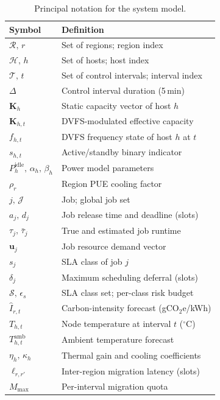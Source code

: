 \documentclass[a4paper,fleqn]{cas-dc}
\begin{document}
\begin{table}[!htb]
\centering
\caption{Principal notation for the system model.}
\label{tab:notation}
\footnotesize
\setlength{\tabcolsep}{6pt}
\renewcommand{\arraystretch}{1.25}
\begin{tabular}{>{\bfseries}p{3.1cm} p{4.8cm}}
\toprule
\normalfont\textbf{Symbol} & \textbf{Definition} \\
\midrule
\rowcolor{black!5}$\mathcal{R},\,r$              & Set of regions; region index \\
$\mathcal{H},\,h$              & Set of hosts; host index \\
\rowcolor{black!5}$\mathcal{T},\,t$              & Set of control intervals; interval index \\
$\Delta$                       & Control interval duration (5\,min) \\
\rowcolor{black!5}$\mathbf{K}_h$                 & Static capacity vector of host $h$ \\
$\mathbf{K}_{h,t}$             & DVFS-modulated effective capacity \\
\rowcolor{black!5}$f_{h,t}$                      & DVFS frequency state of host $h$ at $t$ \\
$s_{h,t}$                      & Active/standby binary indicator \\
\rowcolor{black!5}$P^{\mathrm{idle}}_h,\,\alpha_h,\,\beta_h$ & Power model parameters \\
$\rho_r$                       & Region PUE cooling factor \\
\rowcolor{black!5}$j,\,\mathcal{J}$              & Job; global job set \\
$a_j,\,d_j$                    & Job release time and deadline (slots) \\
\rowcolor{black!5}$\tau_j,\,\bar{\tau}_j$        & True and estimated job runtime \\
$\mathbf{u}_j$                 & Job resource demand vector \\
\rowcolor{black!5}$s_j$                          & SLA class of job $j$ \\
$\delta_j$                     & Maximum scheduling deferral (slots) \\
\rowcolor{black!5}$\mathcal{S},\,\epsilon_s$      & SLA class set; per-class risk budget \\
$\hat{I}_{r,t}$                & Carbon-intensity forecast (gCO$_2$e/kWh) \\
\rowcolor{black!5}$T_{h,t}$                      & Node temperature at interval $t$ ($^\circ$C) \\
$T^{\mathrm{amb}}_{h,t}$       & Ambient temperature forecast \\
\rowcolor{black!5}$\eta_h,\,\kappa_h$            & Thermal gain and cooling coefficients \\
$\ell_{r,r'}$                  & Inter-region migration latency (slots) \\
\rowcolor{black!5}$M_{\max}$                     & Per-interval migration quota \\
\bottomrule
\end{tabular}
\end{table}
\end{document}

